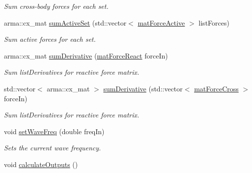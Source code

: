 \begin{DoxyCompactItemize}
\begin{DoxyCompactList}\small\item\em Sum cross-\/body forces for each set. \end{DoxyCompactList}\item 
arma\-::cx\-\_\-mat \hyperlink{classosea_1_1ofreq_1_1_motion_solver_a0546fbdb4b4c80b1eb8e13c8fb799217}{sum\-Active\-Set} (std\-::vector$<$ \hyperlink{classosea_1_1ofreq_1_1mat_force_active}{mat\-Force\-Active} $>$ list\-Forces)
\begin{DoxyCompactList}\small\item\em Sum active forces for each set. \end{DoxyCompactList}\item 
arma\-::cx\-\_\-mat \hyperlink{classosea_1_1ofreq_1_1_motion_solver_a07eeaf738ebae2ce078de86e61132220}{sum\-Derivative} (\hyperlink{classosea_1_1ofreq_1_1mat_force_react}{mat\-Force\-React} force\-In)
\begin{DoxyCompactList}\small\item\em Sum list\-Derivatives for reactive force matrix. \end{DoxyCompactList}\item 
std\-::vector$<$ arma\-::cx\-\_\-mat $>$ \hyperlink{classosea_1_1ofreq_1_1_motion_solver_a07a30b3c6011f6e86d71ba03f738c510}{sum\-Derivative} (std\-::vector$<$ \hyperlink{classosea_1_1ofreq_1_1mat_force_cross}{mat\-Force\-Cross} $>$ force\-In)
\begin{DoxyCompactList}\small\item\em Sum list\-Derivatives for reactive force matrix. \end{DoxyCompactList}\item 
void \hyperlink{classosea_1_1ofreq_1_1_motion_solver_a5deee421d26ef9729e0a870fd48b4403}{set\-Wave\-Freq} (double freq\-In)
\begin{DoxyCompactList}\small\item\em Sets the current wave frequency. \end{DoxyCompactList}\item 
\hypertarget{classosea_1_1ofreq_1_1_motion_solver_a28190e2b9c937f8889ba37db35069c52}{void \hyperlink{classosea_1_1ofreq_1_1_motion_solver_a28190e2b9c937f8889ba37db35069c52}{calculate\-Outputs} ()}\label{classosea_1_1ofreq_1_1_motion_solver_a28190e2b9c937f8889ba37db35069c52}


\end{DoxyCompactItemize}
